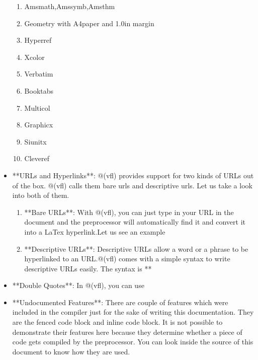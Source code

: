 \documentclass{article}
\begin{document}
\begin{itemize}
\begin{enumerate}

\item Amsmath,Amssymb,Amsthm

\item Geometry with A4paper and 1.0in margin

\item Hyperref

\item Xcolor

\item Verbatim

\item Booktabs

\item Multicol

\item Graphicx

\item Siunitx

\item Cleveref

\end{enumerate}

\item **URLs and Hyperlinks**: @(vfl) provides support for two kinds of URLs out of the box. @(vfl) calls them bare urls and descriptive urls. Let us take a look into both of them.

\begin{enumerate}

\item **Bare URLs**: With @(vfl), you can just type in your URL in the document and the preprocessor will automatically find it and convert it into a LaTex hyperlink.Let us see an example


\item **Descriptive URLs**: Descriptive URLs allow a word or a phrase to be hyperlinked to an URL.@(vfl) comes with a simple syntax to write descriptive URLs easily. The syntax is **%


\end{enumerate}

\item **Double Quotes**: In @(vfl), you can use %

\item **Undocumented Features**: There are couple of features which were included in the compiler just for the sake of writing this documentation. They are the fenced code block and inline code block. It is not possible to demonstrate their features here because they determine whether a piece of code gets compiled by the preprocessor. You can look inside the source of this document to know how they are used. 

\end{itemize}
\end{document}
